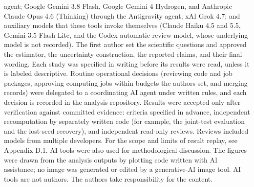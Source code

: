 \documentclass[11pt]{article}
\begin{document}
agent; Google Gemini 3.8 Flash, Google Gemini 4 Hydrogen, and Anthropic Claude Opus 4.6 (Thinking) through the Antigravity agent; xAI Grok 4.7;
and auxiliary models that these tools invoke themselves (Claude Haiku 4.5 and 5.5, Gemini 3.5 Flash Lite, and the
Codex automatic review model, whose underlying model is not recorded). The first author set the scientific questions and approved
the estimator, the uncertainty construction, the reported claims, and their final wording. Each study was specified in writing before its results were read, unless it is labeled
descriptive. Routine operational decisions (reviewing code and job packages, approving computing jobs within budgets
the authors set, and merging records) were delegated to a coordinating AI agent under written rules, and each
decision is recorded in the analysis repository. Results were accepted only after verification against committed
evidence: criteria specified in advance, independent recomputation by separately written code (for example, the
joint-test evaluation and the lost-seed recovery), and independent read-only reviews. Reviews included models from
multiple developers. For the scope and limits of result replay, see Appendix D.1. AI tools were also used for
methodological discussion. The figures were drawn from the analysis outputs by plotting code written with AI assistance;
no image was generated or edited by a generative-AI image tool. AI tools are not authors. The authors take responsibility for the content.

\appendix





\printbibliography
\end{document}

